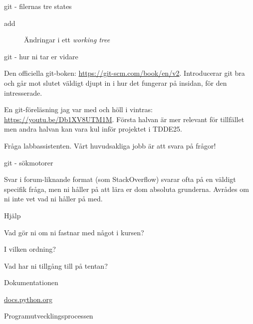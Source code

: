 \documentclass{beamer}
\begin{document}
  \begin{frame}{git - filernas tre states}

    \begin{description}
      \item[add] Ändringar i ett \emph{working tree}
    \end{description}

  \end{frame}

  \begin{frame}{git - hur ni tar er vidare}

    Den officiella git-boken: \url{https://git-scm.com/book/en/v2}. Introducerar
    git bra och går mot slutet väldigt djupt in i hur det fungerar på insidan,
    för den intresserade.

    En git-föreläsning jag var med och höll i vintras:
    \url{https://youtu.be/Db1XV8UTM1M}. Första halvan är mer relevant för
    tillfället men andra halvan kan vara kul inför projektet i TDDE25.
    
    Fråga labbassistenten. Vårt huvudsakliga jobb är att svara på frågor!

  \end{frame}

  \begin{frame}{git - sökmotorer}

    Svar i forum-liknande format (som StackOverflow) svarar ofta på en väldigt
      specifik fråga, men ni håller på att lära er dom absoluta grunderna.
      Avrådes om ni inte vet vad ni håller på med.

  \end{frame}

  \begin{frame}{Hjälp}

    Vad gör ni om ni fastnar med något i kursen?

    I vilken ordning?

    \pause{}

    Vad har ni tillgång till på tentan?

  \end{frame}

  \begin{frame}{Dokumentationen}

    \url{docs.python.org}

  \end{frame}

  \begin{frame}{Programutvecklingsprocessen}

  \end{frame}
\end{document}
